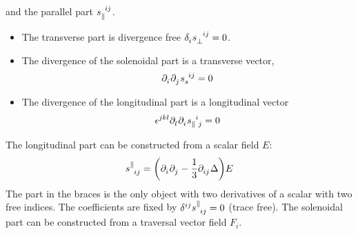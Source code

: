 and the parallel part $\tensor{s}{_\parallel^i^j}$.
\begin{itemize}
    \item The transverse part is divergence free $ \tensor{\delta}{_i} \tensor{s}{_\perp^i^j} = 0$.
    \item The divergence of the solenoidal part is a transverse vector,
    \begin{equation}
        \tensor{\partial}{_i} \tensor{\partial}{_j} \tensor{s}{_s^i^j} = 0
    \end{equation}
    \item The divergence of the longitudinal part is a longitudinal vector
    \begin{equation}
        \tensor{\epsilon}{^j^k^l} \tensor{\partial}{_l} \tensor{\partial}{_i} \tensor{s}{_\parallel^i_j} = 0
    \end{equation}
\end{itemize}
The longitudinal part can be constructed from a scalar field $E$:
\begin{equation}
    \tensor{s}{^\parallel_i_j} = \left( \tensor{\partial}{_i} \tensor{\partial}{_j} - \frac{1}{3} \tensor{\partial}{_i_j} \Delta \right) E
\end{equation}
The part in the braces is the only object with two derivatives of a scalar with two free indices. 
The coefficients are fixed by $ \tensor{\delta}{^i^j} \tensor{s}{^\parallel_i_j} = 0$ (trace free).
The solenoidal part can be constructed from a traversal vector field $F_i$.